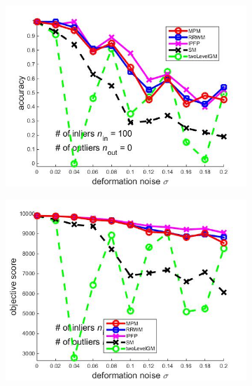 \documentclass[
	fontsize=12pt,
	paper=a4,
	twoside=false,
	numbers=noenddot,
	plainheadsepline,
	toc=listof,
	toc=bibliography
]{scrartcl}
\begin{document}
\begin{figure}[ht] 
	\begin{subfigure}[b]{0.3\textwidth}
		\centering
		\includegraphics[scale=0.25]{"fig_ver2108/syntheticPointSets/deformation_test/accuracy_greedy"} 
	\end{subfigure}%
	\begin{subfigure}[b]{0.3\textwidth}
		\centering
		\includegraphics[scale=0.25]{"fig_ver2108/syntheticPointSets/deformation_test/score_greedy"} 
	\end{subfigure} 
	\begin{subfigure}[b]{0.3\textwidth}
		\centering

\end{subfigure}
\end{figure}
\end{document}
